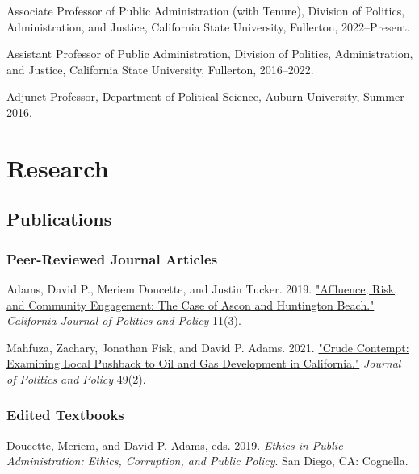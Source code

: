 \documentclass[12pt,letterpaper]{article}
\renewenvironment{itemize}{
  \begin{list}{}{
    \setlength{\leftmargin}{1.5em}
    \setlength{\itemsep}{0.25em}
    \setlength{\parskip}{0pt}
    \setlength{\parsep}{0.25em}
  }
}{
  \end{list}
}
\begin{document}
  \begin{itemize}\leftmargin=2pt\itemindent=-15pt\leftmargin=2pt\itemindent=-15pt
      \item Associate Professor of Public Administration (with Tenure), Division of Politics, Administration, and Justice, California State University, Fullerton, 2022--Present. \vspace{0.2cm}
      \item Assistant Professor of Public Administration, Division of Politics, Administration, and Justice, California State University, Fullerton,  2016--2022.\vspace{0.2cm}
      \item Adjunct Professor, Department of Political Science, Auburn University, Summer 2016.
  \end{itemize}

\section*{Research}

\subsection*{Publications}

\subsubsection*{Peer-Reviewed Journal Articles}

\begin{itemize}\leftmargin=2pt\itemindent=-15pt\leftmargin=2pt\itemindent=-15pt

    \item Adams, David P., Meriem Doucette, and Justin Tucker. 2019. \href{https://escholarship.org/uc/item/2mz2n6qk}{"Affluence, Risk, and Community Engagement: The Case of Ascon and Huntington Beach."} \emph{California Journal of Politics and Policy} 11(3).
    
    \item Mahfuza, Zachary, Jonathan Fisk, and David P. Adams. 2021. \href{https://doi.org/10.1111/polp.12401}{"Crude Contempt: Examining Local Pushback to Oil and Gas Development in California."} \emph{Journal of Politics and Policy} 49(2).

  \end{itemize}

\subsubsection*{Edited Textbooks}
\begin{itemize}\leftmargin=2pt\itemindent=-15pt
  \item Doucette, Meriem, and David P. Adams, eds. 2019. \emph{Ethics in Public Administration: Ethics, Corruption, and Public Policy}. San Diego, CA: Cognella.
\end{itemize}
\end{document}
